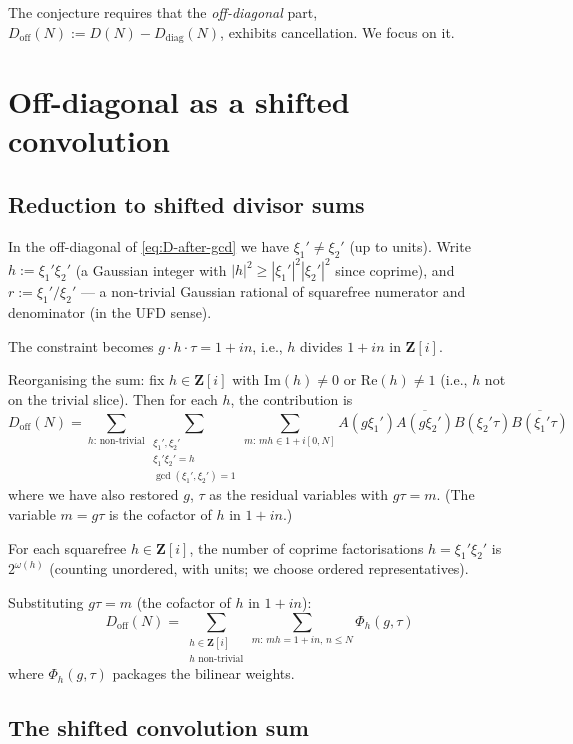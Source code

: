\documentclass[11pt]{article}
\theoremstyle{definition}
\newcommand{\Z}{\mathbf{Z}}
\newcommand{\Zi}{\Z[i]}
\newcommand{\Re}{\mathrm{Re}}
\newcommand{\Im}{\mathrm{Im}}
\renewcommand{\Re}{\mathrm{Re}}
\renewcommand{\Im}{\mathrm{Im}}
\begin{document}
The conjecture requires that the \emph{off-diagonal} part, $D_{\mathrm{off}}(N):=D(N)-D_{\mathrm{diag}}(N)$, exhibits cancellation. We focus on it.

\section{Off-diagonal as a shifted convolution}\label{sec:shifted-conv}

\subsection{Reduction to shifted divisor sums}

In the off-diagonal of \eqref{eq:D-after-gcd} we have $\xi_1'\ne\xi_2'$ (up to units). Write $h:=\xi_1'\xi_2'$ (a Gaussian integer with $|h|^2\ge|\xi_1'|^2|\xi_2'|^2$ since coprime), and $r:=\xi_1'/\xi_2'$ — a non-trivial Gaussian rational of squarefree numerator and denominator (in the UFD sense).

The constraint becomes $g\cdot h\cdot\tau=1+in$, i.e., $h$ divides $1+in$ in $\Zi$.

Reorganising the sum: fix $h\in\Zi$ with $\Im(h)\ne 0$ or $\Re(h)\ne 1$ (i.e., $h$ not on the trivial slice). Then for each $h$, the contribution is
\begin{equation}\label{eq:off-diag-by-h}
D_{\mathrm{off}}(N)=\sum_{h:\,\text{non-trivial}}\sum_{\substack{\xi_1',\xi_2'\\ \xi_1'\xi_2'=h\\ \gcd(\xi_1',\xi_2')=1}}\sum_{m:\,m h\in 1+i[0,N]}A(g\xi_1')\overline{A(g\xi_2')}B(\xi_2'\tau)\overline{B(\xi_1'\tau)}
\end{equation}
where we have also restored $g$, $\tau$ as the residual variables with $g\tau=m$. (The variable $m=g\tau$ is the cofactor of $h$ in $1+in$.)

For each squarefree $h\in\Zi$, the number of coprime factorisations $h=\xi_1'\xi_2'$ is $2^{\omega(h)}$ (counting unordered, with units; we choose ordered representatives).

Substituting $g\tau=m$ (the cofactor of $h$ in $1+in$):
\[
D_{\mathrm{off}}(N)=\sum_{\substack{h\in\Zi\\h\text{ non-trivial}}}\sum_{m:\,mh=1+in,\,n\le N}\Phi_h(g,\tau)
\]
where $\Phi_h(g,\tau)$ packages the bilinear weights.

\subsection{The shifted convolution sum}
\end{document}
